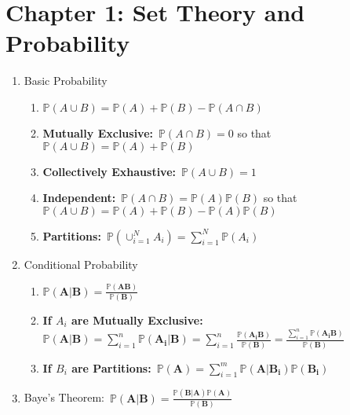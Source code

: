 \section*{Chapter 1: Set Theory and Probability}
\begin{enumerate}
    \item Basic Probability
    \begin{enumerate}
        \item $\mathbb{P}(A \cup B) = \mathbb{P}(A)+\mathbb{P}(B)-\mathbb{P}(A\cap B)$
        \item \textbf{Mutually Exclusive:}~$\mathbb{P}(A \cap B)=0$ so that $\mathbb{P}(A \cup B) = \mathbb{P}(A)+\mathbb{P}(B)$
        \item \textbf{Collectively Exhaustive:}~$\mathbb{P}(A\cup B)=1$
        \item \textbf{Independent:}~$\mathbb{P}(A\cap B)=\mathbb{P}(A)\mathbb{P}(B)$ so that $\mathbb{P}(A \cup B) = \mathbb{P}(A)+\mathbb{P}(B)-\mathbb{P}(A)\mathbb{P}(B)$
        \item \textbf{Partitions:}~$\mathbb{P}(\cup_{i=1}^N A_i)=\sum_{i=1}^{N}\mathbb{P}(A_i)$
    \end{enumerate}
    \item Conditional Probability
    \begin{enumerate}
        \item $\mathbb{P}(\mathbf{A|B}) = \frac{\mathbb{P}(\mathbf{AB})}{\mathbb{P}(\mathbf{B})}$
        \item \textbf{If $A_i$ are Mutually Exclusive:}~$\mathbb{P}(\mathbf{A|B}) = \sum_{i=1}^{n}\mathbb{P}(\mathbf{A_i|B}) = \sum_{i=1}^{n}\frac{\mathbb{P}(\mathbf{A_iB})}{\mathbb{P}(\mathbf{B})}= \frac{\sum_{i=1}^{n}\mathbb{P}(\mathbf{A_iB})}{\mathbb{P}(\mathbf{B})}$
        \item \textbf{If $B_i$ are Partitions:}~$\mathbb{P}(\mathbf{A}) = \sum_{i=1}^{m}\mathbb{P}(\mathbf{A|B_i})\mathbb{P}(\mathbf{B_i})$
    \end{enumerate}
    \item Baye's Theorem:~$\mathbb{P}(\mathbf{A|B}) = \frac{\mathbb{P}(\mathbf{B|A})\mathbb{P}(\mathbf{A})}{\mathbb{P}(\mathbf{B})}$
\end{enumerate}